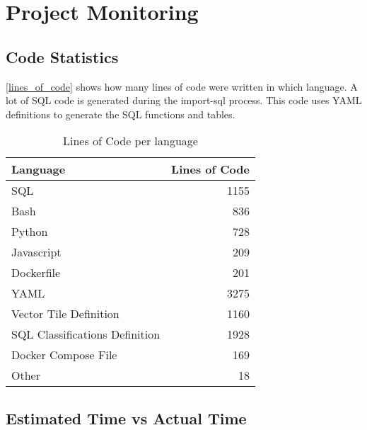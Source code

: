 \chapter{Project Monitoring}\label{project monitoring}

\section{Code Statistics}

\autoref{lines_of_code} shows how many lines of code were written in which language. A lot of SQL code is generated during the import-sql process. This code uses YAML definitions to generate the SQL functions and tables. 

\begin{table}[H]
\centering
\begin{tabular}{lr}
\textbf{Language}   & \multicolumn{1}{l}{\textbf{Lines of Code}} \\ \hline
SQL                     & 1155                              \\
Bash                    & 836                               \\
Python                  & 728                               \\
Javascript              & 209                               \\
Dockerfile              & 201                               \\
YAML                    & 3275                              \\
\noindent\hspace*{8mm}%
Vector Tile Definition  & 1160                              \\
\noindent\hspace*{8mm}%
SQL Classifications Definition        & 1928                              \\
\noindent\hspace*{8mm}%
Docker Compose File     & 169                               \\
\noindent\hspace*{8mm}%
Other                   & 18
\end{tabular}
\caption{Lines of Code per language}
\label{lines_of_code}
\end{table}

\section{Estimated Time vs Actual Time}

